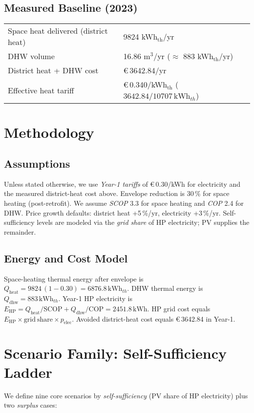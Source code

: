 \documentclass[12pt,oneside]{report}
\begin{document}
\section{Measured Baseline (2023)}
\begin{tabularx}{\textwidth}{@{}l>{\raggedleft\arraybackslash}X@{}}
\toprule
Space heat delivered (district heat) & \num{9824} kWh$_\mathrm{th}$/yr \\
DHW volume & \num{16.86} m$^3$/yr (\(\approx\) \num{883} kWh$_\mathrm{th}$/yr) \\
District heat + DHW cost & \euro\,\num{3642.84}/yr \\
Effective heat tariff & \euro\,\num{0.340}/kWh$_\mathrm{th}$ (\(\num{3642.84}/\num{10707}\,\mathrm{kWh}_{th}\)) \\
\bottomrule
\end{tabularx}

\chapter{Methodology}
\section{Assumptions}
Unless stated otherwise, we use \emph{Year-1 tariffs} of \euro\,\num{0.30}/kWh for electricity and the measured district-heat cost above. Envelope reduction is \num{30}\,\% for space heating (post-retrofit). We assume \emph{SCOP} \num{3.3} for space heating and \emph{COP} \num{2.4} for DHW. Price growth defaults: district heat +\num{5}\,\%/yr, electricity +\num{3}\,\%/yr. Self-sufficiency levels are modeled via the \emph{grid share} of HP electricity; PV supplies the remainder.

\section{Energy and Cost Model}
Space-heating thermal energy after envelope is \(Q_\mathrm{heat}=\num{9824}\,(1-0.30)=\num{6876.8}\,\mathrm{kWh}_{th}\). DHW thermal energy is \(Q_\mathrm{dhw}=\num{883}\,\mathrm{kWh}_{th}\). Year-1 HP electricity is \(E_\mathrm{HP}=Q_\mathrm{heat}/\mathrm{SCOP}+Q_\mathrm{dhw}/\mathrm{COP}=\num{2451.8}\,\mathrm{kWh}\). HP grid cost equals \(E_\mathrm{HP}\times\mathrm{grid\ share}\times p_\mathrm{elec}\). Avoided district-heat cost equals \euro\,\num{3642.84} in Year-1.

\chapter{Scenario Family: Self-Sufficiency Ladder}
We define nine core scenarios by \emph{self-sufficiency} (PV share of HP electricity) plus two \emph{surplus} cases:
\end{document}
